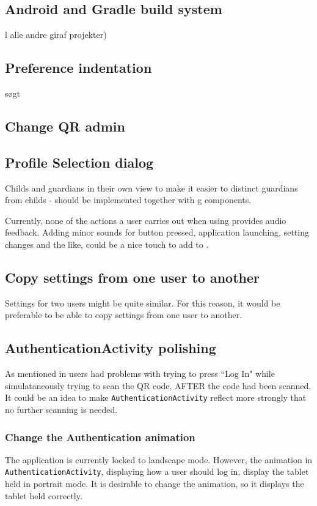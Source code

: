 \subsection{Android and Gradle build system}
l alle andre giraf projekter)

\subsection{Preference indentation}
søgt

\subsection{Change QR admin}

\subsection{Profile Selection dialog}
Childs and guardians in their own view to make it easier to distinct guardians from childs - should be implemented together with g components.

Currently, none of the actions a user carries out when using \launcher provides audio feedback.
Adding minor sounds for button pressed, application launching, setting changes and the like, could be a nice touch to add to \launcher. 

\subsection{Copy settings from one user to another}
Settings for two users might be quite similar.
For this reason, it would be preferable to be able to copy settings from one user to another.                                                                                   
                                                                                   
\subsection{AuthenticationActivity polishing}

As mentioned in  users had problems with trying to press ``Log In" while simulataneously trying to scan the QR code, AFTER the code had been scanned.
It could be an idea to make \lstinline!AuthenticationActivity! reflect more strongly that no further scanning is needed.

\subsubsection{Change the Authentication animation}
The application is currently locked to landscape mode.
However, the animation in \lstinline!AuthenticationActivity!, displaying how a user should log in, display the tablet held in portrait mode.
It is desirable to change the animation, so it displays the tablet held correctly.

